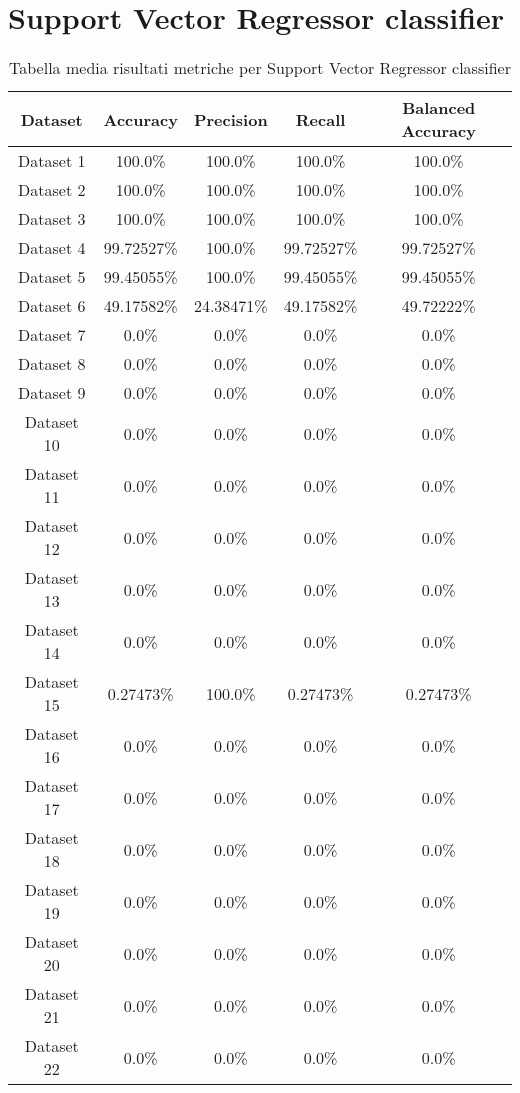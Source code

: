 \section{Support Vector Regressor classifier}
\begin{table}
\centering
\caption{Tabella media risultati metriche per Support Vector Regressor classifier}
\label{tab:4}
\begin{tabular}{ |c||c|c|c|c| }
\hline
Dataset & Accuracy & Precision & Recall & Balanced Accuracy\\
\hline\hline
Dataset 1 & 100.0\% & 100.0\% & 100.0\% & 100.0\%\\
\hline
Dataset 2 & 100.0\% & 100.0\% & 100.0\% & 100.0\%\\
\hline
Dataset 3 & 100.0\% & 100.0\% & 100.0\% & 100.0\%\\
\hline
Dataset 4 & 99.72527\% & 100.0\% & 99.72527\% & 99.72527\%\\
\hline
Dataset 5 & 99.45055\% & 100.0\% & 99.45055\% & 99.45055\%\\
\hline
Dataset 6 & 49.17582\% & 24.38471\% & 49.17582\% & 49.72222\%\\
\hline
Dataset 7 & 0.0\% & 0.0\% & 0.0\% & 0.0\%\\
\hline
Dataset 8 & 0.0\% & 0.0\% & 0.0\% & 0.0\%\\
\hline
Dataset 9 & 0.0\% & 0.0\% & 0.0\% & 0.0\%\\
\hline
Dataset 10 & 0.0\% & 0.0\% & 0.0\% & 0.0\%\\
\hline
Dataset 11 & 0.0\% & 0.0\% & 0.0\% & 0.0\%\\
\hline
Dataset 12 & 0.0\% & 0.0\% & 0.0\% & 0.0\%\\
\hline
Dataset 13 & 0.0\% & 0.0\% & 0.0\% & 0.0\%\\
\hline
Dataset 14 & 0.0\% & 0.0\% & 0.0\% & 0.0\%\\
\hline
Dataset 15 & 0.27473\% & 100.0\% & 0.27473\% & 0.27473\%\\
\hline
Dataset 16 & 0.0\% & 0.0\% & 0.0\% & 0.0\%\\
\hline
Dataset 17 & 0.0\% & 0.0\% & 0.0\% & 0.0\%\\
\hline
Dataset 18 & 0.0\% & 0.0\% & 0.0\% & 0.0\%\\
\hline
Dataset 19 & 0.0\% & 0.0\% & 0.0\% & 0.0\%\\
\hline
Dataset 20 & 0.0\% & 0.0\% & 0.0\% & 0.0\%\\
\hline
Dataset 21 & 0.0\% & 0.0\% & 0.0\% & 0.0\%\\
\hline
Dataset 22 & 0.0\% & 0.0\% & 0.0\% & 0.0\%\\

\end{tabular}
\end{table}
